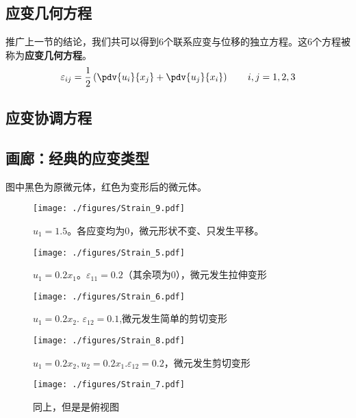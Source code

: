 \subsection{应变几何方程}
推广上一节的结论，我们共可以得到$6$个联系应变与位移的独立方程。这$6$个方程被称为\textbf{应变几何方程}。
\begin{equation}
\varepsilon_{ij} = \frac{1}{2}\left(\pdv{u_i}{x_j}+\pdv{u_j}{x_i}\right) \qquad i,j=1,2,3
\end{equation}

\subsection{应变协调方程}

\subsection{画廊：经典的应变类型}
图中黑色为原微元体，红色为变形后的微元体。
\begin{figure}[ht]
\centering
\texttt{[image: ./figures/Strain\_9.pdf]}
\caption{$u_1=1.5$。各应变均为$0$，微元形状不变、只发生平移。} \label{Strain_fig9}
\end{figure}

\begin{figure}[ht]
\centering
\texttt{[image: ./figures/Strain\_5.pdf]}
\caption{$u_1=0.2x_1$。$\varepsilon_{11}=0.2$（其余项为$0$），微元发生拉伸变形} \label{Strain_fig5}
\end{figure}

\begin{figure}[ht]
\centering
\texttt{[image: ./figures/Strain\_6.pdf]}
\caption{$u_1=0.2x_2$. $\varepsilon_{12}=0.1$,微元发生简单的剪切变形} \label{Strain_fig6}
\end{figure}

\begin{figure}[ht]
\centering
\texttt{[image: ./figures/Strain\_8.pdf]}
\caption{$u_1=0.2x_2, u_2=0.2x_1$.$\varepsilon_{12}=0.2$，微元发生剪切变形} \label{Strain_fig8}
\end{figure}
\begin{figure}[ht]
\centering
\texttt{[image: ./figures/Strain\_7.pdf]}
\caption{同上，但是是俯视图} \label{Strain_fig7}
\end{figure}

